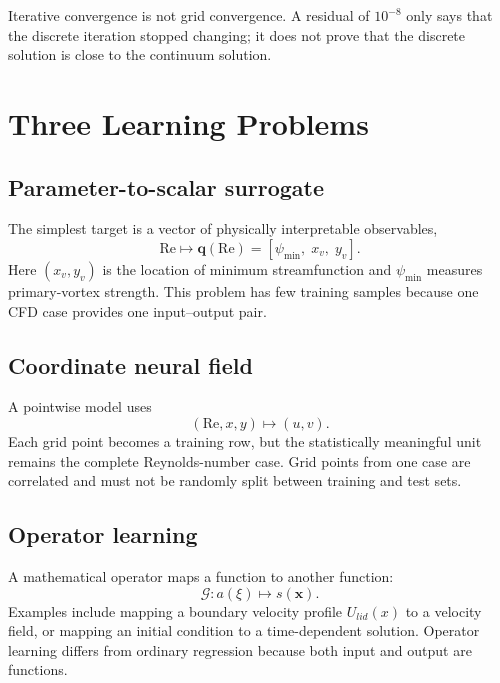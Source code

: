 \documentclass[11pt]{article}
\newcommand{\Rey}{\mathrm{Re}}
\newcommand{\vect}[1]{\bm{#1}}
\begin{document}
\begin{warningbox}
Iterative convergence is not grid convergence. A residual of $10^{-8}$ only says that the discrete iteration stopped changing; it does not prove that the discrete solution is close to the continuum solution.
\end{warningbox}

\section{Three Learning Problems}
\subsection{Parameter-to-scalar surrogate}
The simplest target is a vector of physically interpretable observables,
\begin{equation}
\Rey\longmapsto \vect{q}(\Rey)=\left[\psi_{\min},\;x_v,\;y_v\right].
\end{equation}
Here $(x_v,y_v)$ is the location of minimum streamfunction and $\psi_{\min}$ measures primary-vortex strength. This problem has few training samples because one CFD case provides one input--output pair.

\subsection{Coordinate neural field}
A pointwise model uses
\begin{equation}
(\Rey,x,y)\longmapsto (u,v).
\end{equation}
Each grid point becomes a training row, but the statistically meaningful unit remains the complete Reynolds-number case. Grid points from one case are correlated and must not be randomly split between training and test sets.

\subsection{Operator learning}
A mathematical operator maps a function to another function:
\begin{equation}
\mathcal{G}:a(\xi)\longmapsto s(\vect{x}).
\end{equation}
Examples include mapping a boundary velocity profile $U_{lid}(x)$ to a velocity field, or mapping an initial condition to a time-dependent solution. Operator learning differs from ordinary regression because both input and output are functions.
\end{document}
